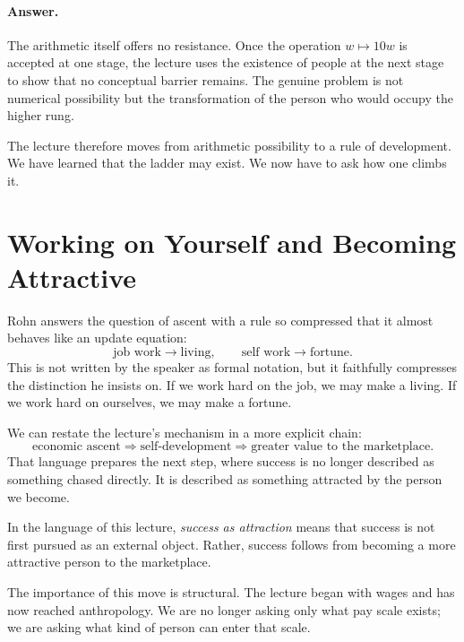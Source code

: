 \paragraph{Answer.} The arithmetic itself offers no resistance. Once the operation \(w \mapsto 10w\) is accepted at one stage, the lecture uses the existence of people at the next stage to show that no conceptual barrier remains. The genuine problem is not numerical possibility but the transformation of the person who would occupy the higher rung.

The lecture therefore moves from arithmetic possibility to a rule of development. We have learned that the ladder may exist. We now have to ask how one climbs it.

\section{Working on Yourself and Becoming Attractive}

Rohn answers the question of ascent with a rule so compressed that it almost behaves like an update equation:
\begin{equation}
\text{job work} \to \text{living}, \qquad \text{self work} \to \text{fortune}.
\end{equation}
This is not written by the speaker as formal notation, but it faithfully compresses the distinction he insists on. If we work hard on the job, we may make a living. If we work hard on ourselves, we may make a fortune.

We can restate the lecture's mechanism in a more explicit chain:
\begin{equation}
\text{economic ascent} \Rightarrow \text{self-development} \Rightarrow \text{greater value to the marketplace}.
\end{equation}
That language prepares the next step, where success is no longer described as something chased directly. It is described as something attracted by the person we become.

\begin{definition}
In the language of this lecture, \emph{success as attraction} means that success is not first pursued as an external object. Rather, success follows from becoming a more attractive person to the marketplace.
\end{definition}

The importance of this move is structural. The lecture began with wages and has now reached anthropology. We are no longer asking only what pay scale exists; we are asking what kind of person can enter that scale.

